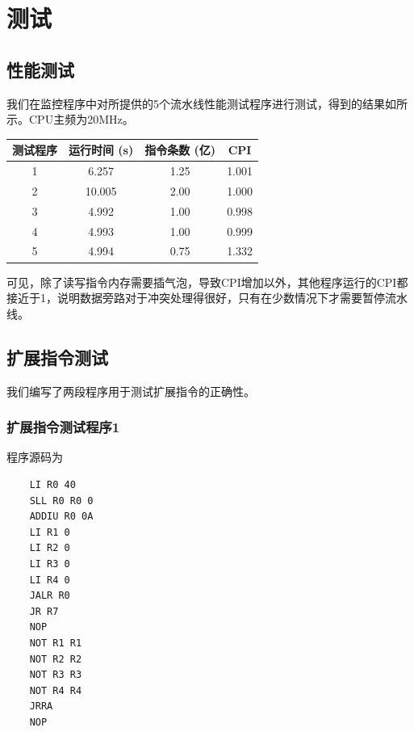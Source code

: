 \section{测试}

\subsection{性能测试}

我们在监控程序中对所提供的5个流水线性能测试程序进行测试，得到的结果如所示。CPU主频为20MHz。

\begin{center}
    \label{table:per_test}
    \begin{longtable}{cccc}
        \toprule
        测试程序 & 运行时间 (s) & 指令条数 (亿) & CPI \\
        \midrule
        1 & 6.257 & 1.25 & 1.001 \\
        2 & 10.005 & 2.00 & 1.000 \\
        3 & 4.992 & 1.00 & 0.998 \\
        4 & 4.993 & 1.00 & 0.999 \\
        5 & 4.994 & 0.75 & 1.332 \\
        \bottomrule
    \end{longtable}
\end{center}

可见，除了读写指令内存需要插气泡，导致CPI增加以外，其他程序运行的CPI都接近于1，说明数据旁路对于冲突处理得很好，只有在少数情况下才需要暂停流水线。

\subsection{扩展指令测试}

我们编写了两段程序用于测试扩展指令的正确性。

\subsubsection{扩展指令测试程序1}

程序源码为

\lstset{basicstyle=\small\ttfamily, numbers=left}
\begin{lstlisting}
    LI R0 40
    SLL R0 R0 0
    ADDIU R0 0A
    LI R1 0
    LI R2 0
    LI R3 0
    LI R4 0
    JALR R0
    JR R7
    NOP
    NOT R1 R1
    NOT R2 R2
    NOT R3 R3
    NOT R4 R4
    JRRA
    NOP
\end{lstlisting}

